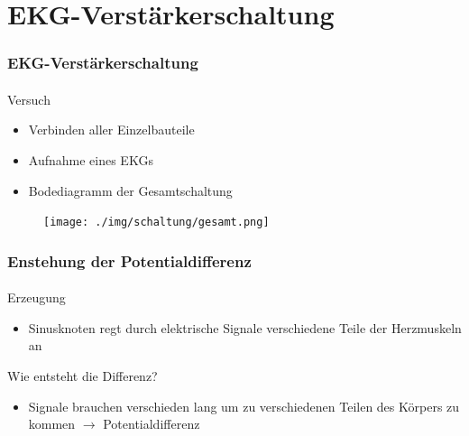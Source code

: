 \section{EKG-Verstärkerschaltung} %
\label{sec:EKG-Verstärkerschaltung}
\begin{frame}
\frametitle{EKG-Verstärkerschaltung}
\framesubtitle{}
    \begin{block}{Versuch}
        \begin{itemize}
            \item Verbinden aller Einzelbauteile
            \item Aufnahme eines EKGs
            \item Bodediagramm der Gesamtschaltung
        \end{itemize}        
    \end{block}
    \begin{figure}[H]
    \begin{center}
            \texttt{[image: ./img/schaltung/gesamt.png]}
    \end{center}
    \end{figure}
\end{frame}
\begin{frame}
\frametitle{Enstehung der Potentialdifferenz}
\framesubtitle{}
    \begin{block}{Erzeugung}
         \begin{itemize}
             \item Sinusknoten regt durch elektrische Signale verschiedene
             Teile der Herzmuskeln an
         \end{itemize}
    \end{block}
    \begin{block}{Wie entsteht die Differenz?}
        \begin{itemize}
            \item Signale brauchen verschieden lang um zu verschiedenen Teilen
            des Körpers zu kommen $\rightarrow$ Potentialdifferenz
        \end{itemize}
    \end{block}
\end{frame}
